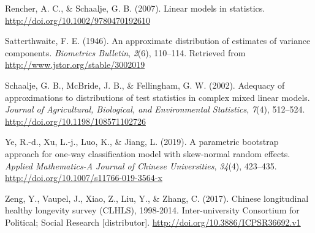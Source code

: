 \documentclass[12pt, twoside]{amherstthesis}
\begin{document}
\leavevmode\hypertarget{ref-rencher_schaalje_2007}{}%
Rencher, A. C., \& Schaalje, G. B. (2007). Linear models in statistics. \url{http://doi.org/10.1002/9780470192610}

\leavevmode\hypertarget{ref-satt}{}%
Satterthwaite, F. E. (1946). An approximate distribution of estimates of variance components. \emph{Biometrics Bulletin}, \emph{2}(6), 110--114. Retrieved from \url{http://www.jstor.org/stable/3002019}

\leavevmode\hypertarget{ref-schaalje_adequacy_2002}{}%
Schaalje, G. B., McBride, J. B., \& Fellingham, G. W. (2002). Adequacy of approximations to distributions of test statistics in complex mixed linear models. \emph{Journal of Agricultural, Biological, and Environmental Statistics}, \emph{7}(4), 512--524. \url{http://doi.org/10.1198/108571102726}

\leavevmode\hypertarget{ref-ye_parametric_2019}{}%
Ye, R.-d., Xu, L.-j., Luo, K., \& Jiang, L. (2019). A parametric bootstrap approach for one-way classification model with skew-normal random effects. \emph{Applied Mathematics-A Journal of Chinese Universities}, \emph{34}(4), 423--435. \url{http://doi.org/10.1007/s11766-019-3564-x}

\leavevmode\hypertarget{ref-zeng_chinese_2017}{}%
Zeng, Y., Vaupel, J., Xiao, Z., Liu, Y., \& Zhang, C. (2017). Chinese longitudinal healthy longevity survey (CLHLS), 1998-2014. Inter-university Consortium for Political; Social Research {[}distributor{]}. \url{http://doi.org/10.3886/ICPSR36692.v1}

\end{document}
